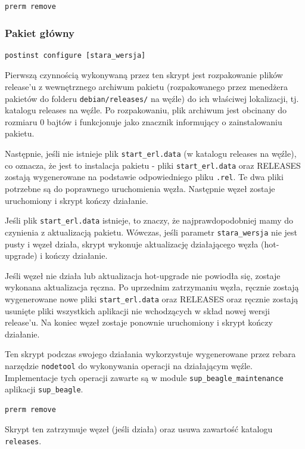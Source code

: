 \documentclass[polish,12pt]{aghthesis}
\begin{document}
\begin{lstlisting}
prerm remove
\end{lstlisting}

\subsubsection{Pakiet główny}

\begin{lstlisting}
postinst configure [stara_wersja]
\end{lstlisting}

Pierwszą czynnością wykonywaną przez ten skrypt jest rozpakowanie plików release'u z wewnętrznego archiwum pakietu (rozpakowanego przez menedżera pakietów do folderu \texttt{debian/releases/} na węźle) do ich właściwej lokalizacji, tj. katalogu releases na węźle. Po rozpakowaniu, plik archiwum jest obcinany do rozmiaru 0 bajtów i funkcjonuje jako znacznik informujący o zainstalowaniu pakietu.

Następnie, jeśli nie istnieje plik \texttt{start\_erl.data} (w katalogu releases na węźle), co oznacza, że jest to instalacja pakietu - pliki \texttt{start\_erl.data} oraz RELEASES zostają wygenerowane na podstawie odpowiedniego pliku \texttt{.rel}. Te dwa pliki potrzebne są do poprawnego uruchomienia węzła. Następnie węzeł zostaje uruchomiony i skrypt kończy działanie.

Jeśli plik \texttt{start\_erl.data} istnieje, to znaczy, że najprawdopodobniej mamy do czynienia z aktualizacją pakietu. Wówczas, jeśli parametr \texttt{stara\_wersja} nie jest pusty i węzeł działa, skrypt wykonuje aktualizację działającego węzła (hot-upgrade) i kończy działanie.

Jeśli węzeł nie działa lub aktualizacja hot-upgrade nie powiodła się, zostaje wykonana aktualizacja ręczna. Po uprzednim zatrzymaniu węzła, ręcznie zostają wygenerowane nowe pliki \texttt{start\_erl.data} oraz RELEASES oraz ręcznie zostają usunięte pliki wszystkich aplikacji nie wchodzących w skład nowej wersji release'u. Na koniec węzeł zostaje ponownie uruchomiony i skrypt kończy działanie.

Ten skrypt podczas swojego działania wykorzystuje wygenerowane przez rebara narzędzie \texttt{nodetool} do wykonywania operacji na działającym węźle. Implementacje tych operacji zawarte są w module \texttt{sup\_beagle\_maintenance} aplikacji \texttt{sup\_beagle}.

\begin{lstlisting}
prerm remove
\end{lstlisting}

Skrypt ten zatrzymuje węzeł (jeśli działa) oraz usuwa zawartość katalogu \texttt{releases}.
\end{document}
